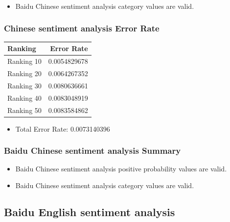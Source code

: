 \begin{itemize}
\item Baidu Chinese sentiment analysis category values are valid.
\end{itemize}

\subsubsection{Chinese sentiment analysis Error Rate}
\label{sec:org6ed59fa}
\begin{center}
\begin{tabular}{lr}
Ranking & Error Rate\\
\hline
Ranking 10 & 0.0054829678\\
Ranking 20 & 0.0064267352\\
Ranking 30 & 0.0080636661\\
Ranking 40 & 0.0083048919\\
Ranking 50 & 0.0083584862\\
\end{tabular}
\end{center}

\begin{itemize}
\item Total Error Rate: 0.0073140396
\end{itemize}
\subsubsection{Baidu Chinese sentiment analysis Summary}
\label{sec:org1db4618}
\begin{itemize}
\item Baidu Chinese sentiment analysis positive probability values are valid.
\item Baidu Chinese sentiment analysis category values are valid.
\end{itemize}

\subsection{Baidu English sentiment analysis}
\label{sec:orgf18522b}
